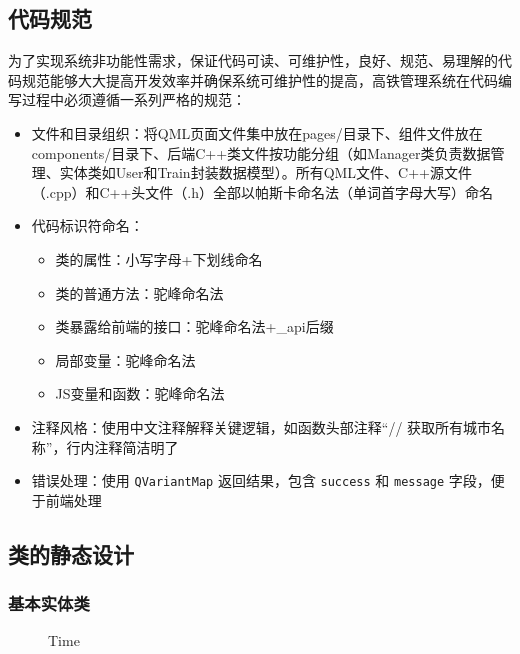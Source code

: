 \documentclass{article}
\begin{document}
	\subsection{代码规范}
	为了实现系统非功能性需求，保证代码可读、可维护性，良好、规范、易理解的代码规范能够大大提高开发效率并确保系统可维护性的提高，高铁管理系统在代码编写过程中必须遵循一系列严格的规范：
	\begin{itemize}
		\item 文件和目录组织：将QML页面文件集中放在pages/目录下、组件文件放在components/目录下、后端C++类文件按功能分组（如Manager类负责数据管理、实体类如User和Train封装数据模型）。所有QML文件、C++源文件（.cpp）和C++头文件（.h）全部以帕斯卡命名法（单词首字母大写）命名
		\item 代码标识符命名：
		\begin{itemize}
			\item 类的属性：小写字母+下划线命名
			\item 类的普通方法：驼峰命名法
			\item 类暴露给前端的接口：驼峰命名法+\_api后缀
			\item 局部变量：驼峰命名法
			\item JS变量和函数：驼峰命名法
		\end{itemize}
		\item 注释风格：使用中文注释解释关键逻辑，如函数头部注释“// 获取所有城市名称”，行内注释简洁明了
		\item 错误处理：使用 \texttt{QVariantMap} 返回结果，包含 \texttt{success} 和 \texttt{message} 字段，便于前端处理
	\end{itemize}
	
	\subsection{类的静态设计}
	\subsubsection{基本实体类}
	
	\begin{figure}[H]
		\centering
		
		\caption{Time}
		\label{Time}
	\end{figure}
	
\end{document}
